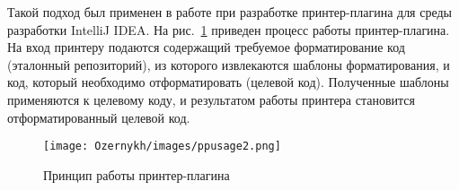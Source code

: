 
Такой подход был применен в работе \cite{paper:while} при разработке принтер-плагина для среды разработки IntelliJ IDEA. %
На рис.~\ref{intro:howto} приведен процесс работы принтер-плагина. 
На вход принтеру подаются содержащий требуемое форматирование код (эталонный репозиторий), из которого извлекаются шаблоны форматирования, и код, который необходимо отформатировать (целевой код).
Полученные шаблоны применяются к целевому коду, и результатом работы принтера становится отформатированный целевой код.


\begin{figure}
    \centering
    \texttt{[image: Ozernykh/images/ppusage2.png]}
    \caption{Принцип работы принтер-плагина}
    \label{intro:howto}

\end{figure}

